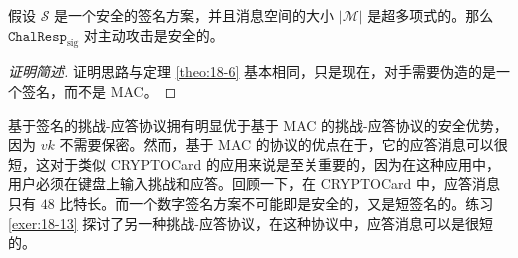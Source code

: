 \begin{theorem}\label{theo:18-7}
假设 $\mathcal{S}$ 是一个安全的签名方案，并且消息空间的大小 $|\mathcal{M}|$ 是超多项式的。那么 $\mathtt{ChalResp}_\mathrm{sig}$ 对主动攻击是安全的。
\end{theorem}

\begin{proof}[证明简述]
证明思路与定理 \ref{theo:18-6} 基本相同，只是现在，对手需要伪造的是一个签名，而不是 MAC。
\end{proof}

基于签名的挑战-应答协议拥有明显优于基于 MAC 的挑战-应答协议的安全优势，因为 $vk$ 不需要保密。然而，基于 MAC 的协议的优点在于，它的应答消息可以很短，这对于类似 CRYPTOCard 的应用来说是至关重要的，因为在这种应用中，用户必须在键盘上输入挑战和应答。回顾一下，在 CRYPTOCard 中，应答消息只有 $48$ 比特长。而一个数字签名方案不可能即是安全的，又是短签名的。练习 \ref{exer:18-13} 探讨了另一种挑战-应答协议，在这种协议中，应答消息可以是很短的。